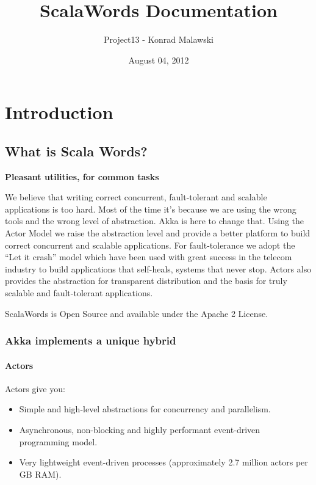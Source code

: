 \documentclass[a4paper,10pt,oneside,openany]{sphinxmanual}
\title{ ScalaWords Documentation}
\date{August 04, 2012}
\author{Project13 - Konrad Malawski}
\begin{document}
\maketitle
\tableofcontents
{}\label{index::doc}



\chapter{Introduction}
\label{intro/index:scalawords-docs}\label{intro/index:introduction}\label{intro/index::doc}

\section{What is Scala Words?}
\label{intro/what-is-scala-words:what-is-scala-words}\label{intro/what-is-scala-words::doc}\label{intro/what-is-scala-words:id1}
\textbf{Pleasant utilities, for common tasks}

We believe that writing correct concurrent, fault-tolerant and scalable
applications is too hard. Most of the time it's because we are using the wrong
tools and the wrong level of abstraction. Akka is here to change that. Using the
Actor Model we raise the abstraction level and provide a better platform to build
correct concurrent and scalable applications. For fault-tolerance we adopt the
``Let it crash'' model which have been used with great success in the telecom industry to build
applications that self-heals, systems that never stop. Actors also provides the
abstraction for transparent distribution and the basis for truly scalable and
fault-tolerant applications.

ScalaWords is Open Source and available under the Apache 2 License.


\subsection{Akka implements a unique hybrid}
\label{intro/what-is-scala-words:akka-implements-a-unique-hybrid}

\subsubsection{Actors}
\label{intro/what-is-scala-words:actors}
Actors give you:
\begin{itemize}
\item {} 
Simple and high-level abstractions for concurrency and parallelism.

\item {} 
Asynchronous, non-blocking and highly performant event-driven programming model.

\item {} 
Very lightweight event-driven processes (approximately 2.7 million actors per GB RAM).

\end{itemize}
\end{document}

